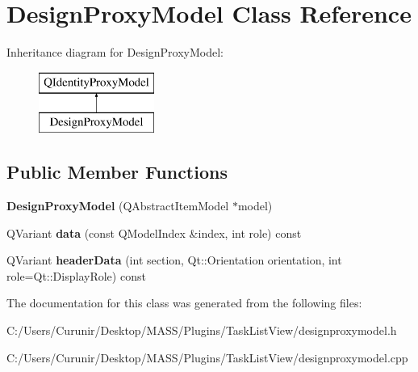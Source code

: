 \hypertarget{class_design_proxy_model}{}\section{Design\+Proxy\+Model Class Reference}
\label{class_design_proxy_model}
Inheritance diagram for Design\+Proxy\+Model\+:\begin{figure}[H]
\begin{center}
\leavevmode
\includegraphics[height=2.000000cm]{class_design_proxy_model}
\end{center}
\end{figure}
\subsection*{Public Member Functions}
\begin{DoxyCompactItemize}
\item 
\mbox{\label{class_design_proxy_model_a2f32a37a9e0e12091ffa25d12c2cf172}} 
{\bfseries Design\+Proxy\+Model} (Q\+Abstract\+Item\+Model $\ast$model)
\item 
\mbox{\label{class_design_proxy_model_a83da41a240aa8524cc5694b0db9eacfa}} 
Q\+Variant {\bfseries data} (const Q\+Model\+Index \&index, int role) const
\item 
\mbox{\label{class_design_proxy_model_adc16f436d8f8ebb49ec84d0522de78e0}} 
Q\+Variant {\bfseries header\+Data} (int section, Qt\+::\+Orientation orientation, int role=Qt\+::\+Display\+Role) const
\end{DoxyCompactItemize}


The documentation for this class was generated from the following files\+:\begin{DoxyCompactItemize}
\item 
C\+:/\+Users/\+Curunir/\+Desktop/\+M\+A\+S\+S/\+Plugins/\+Task\+List\+View/designproxymodel.\+h\item 
C\+:/\+Users/\+Curunir/\+Desktop/\+M\+A\+S\+S/\+Plugins/\+Task\+List\+View/designproxymodel.\+cpp\end{DoxyCompactItemize}
